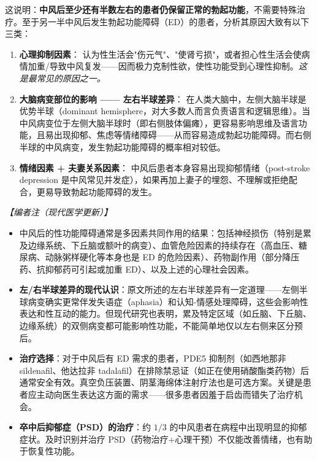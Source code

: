 这说明：\textbf{中风后至少还有半数左右的患者仍保留正常的勃起功能}，不需要特殊治疗。至于另一半中风后发生勃起功能障碍（ED）的患者，分析其原因大致有以下三类：

\begin{enumerate}
	\item \textbf{心理抑制因素}：
	认为性生活会"伤元气"、"使肾亏损"，或者担心性生活会使病情加重/导致中风复发——因而极力克制性欲，使性功能受到心理性抑制。\textit{这是最常见的原因之一。}

	\item \textbf{大脑病变部位的影响 —— 左右半球差异}：
	在人类大脑中，左侧大脑半球是优势半球（dominant hemisphere，对大多数人而言负责语言和逻辑思维）。当中风病变位于左侧大脑半球时（即右侧肢体偏瘫），更容易影响思维及语言功能，且易出现抑郁、焦虑等情绪障碍——从而容易造成勃起功能障碍。而右侧半球的中风病变，发生勃起功能障碍的概率相对较低。

	\item \textbf{情绪因素 + 夫妻关系因素}：
	中风后患者本身容易出现抑郁情绪（post-stroke depression 是中风常见并发症），如果再加上妻子的埋怨、不理解或拒绝配合，更易导致勃起功能障碍的发生。
\end{enumerate}

\noindent\textit{【编者注（现代医学更新）】}
\begin{itemize}
	\item 中风后的性功能障碍通常是多因素共同作用的结果：包括神经损伤（特别是累及边缘系统、下丘脑或额叶的病变）、血管危险因素的持续存在（高血压、糖尿病、动脉粥样硬化等本身也是 ED 的危险因素）、药物副作用（部分降压药、抗抑郁药可引起或加重 ED）、以及上述的心理社会因素。
	\item \textbf{左/右半球差异的现代认识}：原文所述的左右半球差异有一定道理——左侧半球病变确实更常伴发失语症（aphasia）和认知-情感处理障碍，这些会影响性表达和性互动的能力。但现代研究也表明，累及特定区域（如丘脑、下丘脑、边缘系统）的双侧病变都可能影响性功能，不能简单地仅以左右侧来区分预后。
	\item \textbf{治疗选择}：对于中风后有 ED 需求的患者，PDE5 抑制剂（如西地那非 sildenafil、他达拉非 tadalafil）在排除禁忌证（如正在使用硝酸酯类药物）后通常安全有效。真空负压装置、阴茎海绵体注射疗法也是可选方案。关键是患者应主动向医生表达这方面的需求——很多患者因羞于启齿而错失了治疗机会。
	\item \textbf{卒中后抑郁症（PSD）的治疗}：约 $1/3$ 的中风患者在病程中出现明显的抑郁症状。及时识别并治疗 PSD（药物治疗+心理干预）不仅能改善情绪，也有助于恢复性功能。
\end{itemize}

